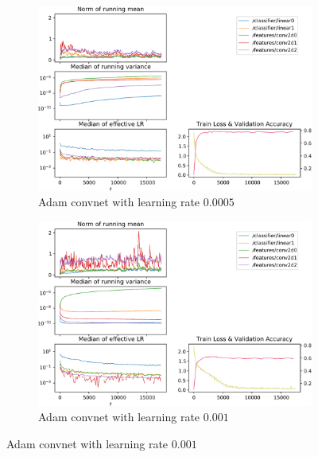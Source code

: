 \begin{figure}
    \caption{Adam metrics on the Adam-Convnet with different learning rates and
    Adam optimiser}
    \begin{subfigure}{\textwidth}
        \centering
        \includegraphics[width=\linewidth]{gfx/diagrams/experiments/adam/adammodel_adam_00005_0_-1.pdf}
        \caption{Adam convnet with learning rate $0.0005$}
    \end{subfigure}

    \begin{subfigure}{\textwidth}
        \centering
        \includegraphics[width=\linewidth]{gfx/diagrams/experiments/adam/adammodel_adam_0001_0_-1.pdf}
        \caption{Adam convnet with learning rate $0.001$}
    \end{subfigure}


\end{figure}
